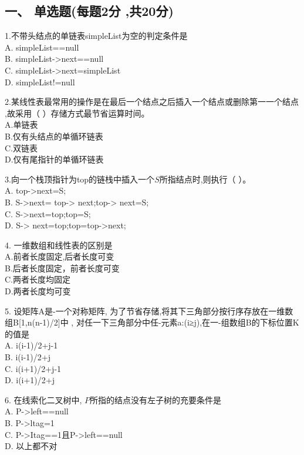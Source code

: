 
\subsection{一、 单选题(每题2分 ,共20分)}

1.不带头结点的单链表simpleList为空的判定条件是 \\
A. simpleList==null \\
B. simpleList->next==null \\
C. simpleList->next=simpleList \\
D. simpleList!=null

2.某线性表最常用的操作是在最后一个结点之后插入一个结点或删除第一一个结点 ,故采用（  ）存储方式最节省运算时间。 \\
A.单链表 \\
B.仅有头结点的单循环链表 \\
C.双链表 \\
D.仅有尾指针的单循环链表

3.向一个栈顶指针为top的链栈中插入一个$S$所指结点时,则执行（    ）。 \\
A. top->next=S; \\
B. S->next= top-> next;top-> next=S; \\
C. S->next=top;top=S; \\
D. S-> next=top;top=top->next;

4. 一维数组和线性表的区别是 \\
A.前者长度固定,后者长度可变 \\
B.后者长度固定，前者长度可变 \\
C.两者长度均固定 \\
D.两者长度均可变

5. 设矩阵A是-一个对称矩阵, 为了节省存储,将其下三角部分按行序存放在一维数组B[1,n(n-1)/2]中 , 对任一下三角部分中任-元素a:(i≥j),在一-组数组B的下标位置K的值是 \\
A. i(i-1)/2+j-1 \\
B. i(i-1)/2+j \\
C. i(i+1)/2+j-1 \\
D. i(i+1)/2+j

6. 在线索化二叉树中, $P$所指的结点没有左子树的充要条件是 \\
A. P->left==null \\
B. P->ltag=1 \\
C. P->Itag==1且P->left==null \\
D. 以上都不对

